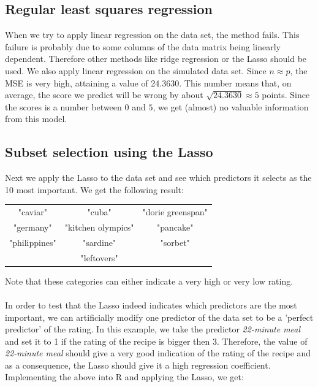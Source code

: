 \subsection{Regular least squares regression}
When we try to apply linear regression on the data set, the method fails. This failure is probably due to some columns of the data matrix being linearly dependent. Therefore other methods like ridge regression or the Lasso should be used. We also apply linear regression on the simulated data set. Since $n \approx p$, the MSE is very high, attaining a value of \num{24.3630}. This number means that, on average, the score we predict will be wrong by about $\sqrt{24.3630} \approx 5$ points. Since the scores is a number between $0$ and $5$, we get (almost) no valuable information from this model.

\subsection{Subset selection using the Lasso} \label{sec:SubsetSelectionUsingLasso}
Next we apply the Lasso to the data set and see which predictors it selects as the 10 most important. We get the following result:
\begin{center}
\begin{tabular}{ccc}
    \vspace{3pt}
     "caviar" & "cuba" & "dorie greenspan"\\
     \vspace{3pt}
     "germany" & "kitchen olympics" & "pancake"\\
     \vspace{3pt}
     "philippines" & "sardine" & "sorbet"\\
     & "leftovers" &
\end{tabular}
\end{center}
Note that these categories can either indicate a very high or very low rating.\\
\\
In order to test that the Lasso indeed indicates which predictors are the most important, we can artificially modify one predictor of the data set to be a 'perfect predictor' of the rating. In this example, we take the predictor \textit{22-minute meal} and set it to 1 if the rating of the recipe is bigger then 3. Therefore, the value of \textit{22-minute meal} should give a very good indication of the rating of the recipe and as a consequence, the Lasso should give it a high regression coefficient. Implementing the above into R and applying the Lasso, we get:
